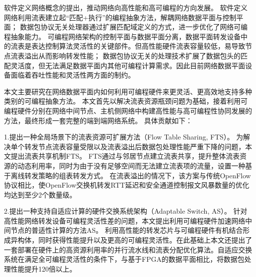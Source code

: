 
\setcounter{page}{1}

%
%
%

软件定义网络概念的提出，推动网络向高性能和高可编程的方向发展。
软件定义网络利用流表建立起“匹配+执行”的编程抽象方法，解耦网络数据平面与控制平面；
数据包协议无关处理器通过扩展匹配域定义的方式，进一步优化了网络可编程抽象能力。
可编程网络架构的控制平面与数据平面分离，数据平面转发设备中的流表是表达控制算法灵活性的关键部件。但高性能硬件流表容量较低，易导致节点流表溢出从而影响转发性能；
数据包协议无关的处理技术扩展了数据包头的匹配灵活度，但无法满足数据平面内其他可编程计算需求。因此目前网络数据平面设备面临着吞吐性能和灵活性两方面的制约。

本文主要研究在网络数据平面内如何利用可编程硬件来更灵活、更高效地支持多种类别的可编程抽象方法。
本文首先以解决流表资源瓶颈问题为基础，接着利用可编程硬件分别在网络中间节点、主机侧网络中构建高性能与高可编程性协同发展的方法，最终形成一套完整的端到端网络系统。
具体贡献如下：


1.提出一种全局场景下的流表资源可扩展方法（Flow Table Sharing, FTS）。
为解决单个转发节点流表容量受限以及流表溢出后数据包处理性能严重下降的问题，本文提出流表共享机制FTS。
FTS通过与邻居节点建立流表共享，提升整体流表资源的动态利用率，同时为由于没有足够空间而无法建立流表项的流量，设置一种基于离线转发策略的组表转发方式。
在流表溢出的情况下，该方案与传统OpenFlow协议相比，使OpenFlow交换机转发RTT延迟和安全通道控制报文风暴数量的优化均达到至少2个数量级。

2.提出一种支持自适应计算的硬件交换系统架构（Adaptable Switch, AS）。
针对高性能网络转发设备可编程灵活性差的问题，本文提出利用可编程硬件加速网络中间节点的普适性计算的方法AS。
利用高性能的转发芯片与可编程硬件有机结合形成异构体，同时获得性能提升以及更高的可编程灵活性。在此基础上本文还提出了一套部署在硬件上的高资源利用率的并行流水线和流表分配优化算法。自适应交换系统在满足全可编程灵活性的条件下，与基于FPGA的数据平面相比，将数据包处理性能提升120倍以上。

